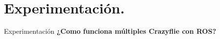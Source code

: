 \documentclass[hyperref={pdfpagelabels=false}]{beamer}
\begin{document}
%
%
%
%
%
%

\section{Experimentación.}
\begin{frame}{Experimentación}
\centering
\textbf{¿Como funciona múltiples Crazyflie con ROS? 
}	
\end{frame}
\end{document}
